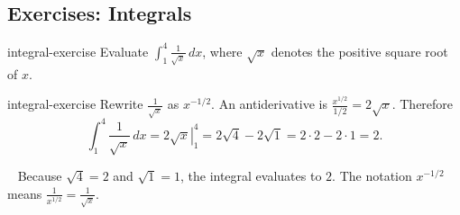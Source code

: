 \documentclass[11pt,a4paper]{article}
\begin{document}
\subsection*{Exercises: Integrals}

\begin{exercise}{}{integral-exercise}
Evaluate $\int_{1}^{4} \frac{1}{\sqrt{x}}\,dx$, where $\sqrt{x}$ denotes the positive square root of $x$.
\end{exercise}

\begin{exercisesolution}{integral-exercise}
Rewrite $\frac{1}{\sqrt{x}}$ as $x^{-1/2}$. An antiderivative is $\frac{x^{1/2}}{1/2}=2\sqrt{x}$. Therefore
\[
\int_{1}^{4} \frac{1}{\sqrt{x}}\,dx=\left.2\sqrt{x}\right|_{1}^{4}=2\sqrt{4}-2\sqrt{1}=2\cdot 2-2\cdot 1=2.
\]
\end{exercisesolution}~\label{integral-solution}
Because $\sqrt{4}=2$ and $\sqrt{1}=1$, the integral evaluates to $2$. The notation $x^{-1/2}$ means $\frac{1}{x^{1/2}}=\frac{1}{\sqrt{x}}$.
\end{document}
